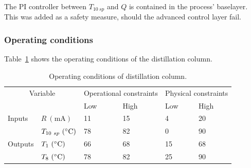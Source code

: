 The PI controller between $T_{10~sp}$ and $Q$ is contained in the process' baselayer. 
This was added as a safety measure, should the advanced control layer fail.

\subsubsection{Operating conditions}
Table~\ref{tab:columnopcon} shows the operating conditions of the distillation column.
\begin{table}[htbp]
  \centering
  \begin{tabular}{llllll}
    \toprule
    \multicolumn{2}{c}{Variable} & \multicolumn{2}{c}{Operational constraints} & \multicolumn{2}{c}{Physical constraints} \\
    && Low & High & Low & High \\ 
    \midrule
    Inputs &$R~(\text{mA})$          & 11 & 15 & 4 & 20 \\
           &$T_{10~sp}~(^{\circ}\text{{C}})$ & 78 & 82 & 0 & 90 \\[1.3ex]
    Outputs &$T_1~(^{\circ}\text{{C}})$     & 66 & 68 & 15 & 68 \\
            &$T_{8}~(^{\circ}\text{{C}})$   & 78 & 82 & 25 & 90 \\
    \bottomrule
  \end{tabular}
  \caption{Operating conditions of distillation column.}
  \label{tab:columnopcon}
\end{table}

